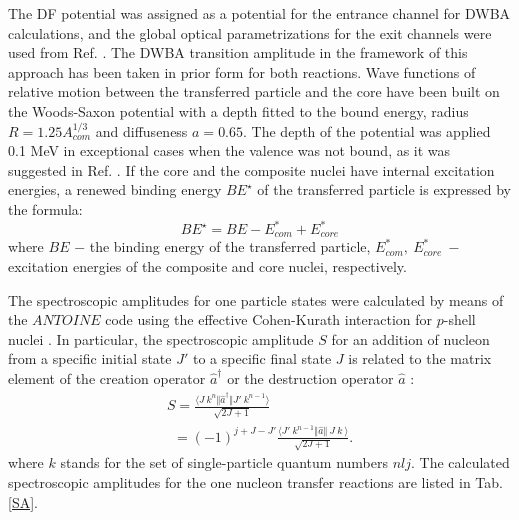\documentclass[10pt]{iopart}
\begin{document}
The DF potential was assigned as a potential for the entrance channel for DWBA calculations, and the global optical parametrizations for the exit channels were used from Ref. \cite{globalProton, globalTriton}.  The DWBA transition amplitude in the framework of this approach has been taken in prior form for both reactions. Wave functions of relative motion between the transferred particle and the core have been built on the Woods-Saxon potential with a depth fitted to the bound energy, radius $R=1.25 A_{com}^{1/3}$ and diffuseness $a=0.65$. The depth of the potential was applied 0.1 MeV in exceptional cases when the valence was not bound, as it was suggested in Ref. \cite{harakeh1980}. If the core and the composite nuclei have internal excitation energies, a renewed binding energy $BE^{\star}$ of the transferred particle is expressed by the formula:
\begin{equation}
BE^{\star}=BE - E_{com}^*+E_{core}^*
\end{equation}
where $BE$ $-$ the binding energy of the transferred particle, $E_{com}^*,~E_{core}^*~-$  excitation energies of the composite and  core nuclei, respectively.

The spectroscopic amplitudes for one particle states were calculated by means of the $ANTOINE$ code \cite{antoine}  using the effective Cohen-Kurath interaction for $p$-shell nuclei \cite{cohen1965}. In particular, the spectroscopic amplitude  $S$ for an addition of nucleon from a specific initial state $J'$ to a specific final state $J$ is related to the matrix element of the creation operator $\hat{a}^\dagger$ or the destruction operator $\hat{a}$ \cite{brown2017}:
\begin{equation}
\label{eq:SA}
\begin{array}{l}
S=\frac{\langle J~ k^n \Vert \hat{a}^\dagger \Vert J' ~k^{n-1} \rangle}{\sqrt{2J+1}} \\
~~=(-1)^{j+J-J'} \frac{\langle J'~ k^{n-1} \Vert \hat{a} \Vert ~ J ~k ~\rangle}{\sqrt{2J+1}}.
\end{array}
\end{equation}
where $k$ stands for the set of single-particle quantum numbers $nlj$.  The calculated spectroscopic amplitudes for the one nucleon transfer reactions are listed in Tab.\ref{SA}.
\end{document}
